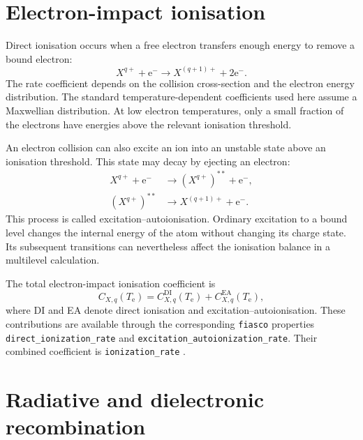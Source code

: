 \documentclass[a4paper,10pt,twoside,openany]{book}
\begin{document}
\section{Electron-impact ionisation}
\label{subsec:electron_ionisation}

Direct ionisation occurs when a free electron transfers enough energy to
remove a bound electron:
\begin{equation}
 X^{q+}+\mathrm e^-
 \longrightarrow X^{(q+1)+}+2\mathrm e^-.
 \label{eq:ion_direct_reaction}
\end{equation}
The rate coefficient depends on the collision cross-section and the electron
energy distribution. The standard temperature-dependent coefficients used here
assume a Maxwellian distribution. At low electron temperatures, only a small
fraction of the electrons have energies above the relevant ionisation threshold.

An electron collision can also excite an ion into an unstable state above an
ionisation threshold. This state may decay by ejecting an electron:
\begin{align}
 X^{q+}+\mathrm e^-
 &\longrightarrow (X^{q+})^{**}+\mathrm e^-,
 \nonumber\\
 (X^{q+})^{**}
 &\longrightarrow X^{(q+1)+}+\mathrm e^-.
 \label{eq:ion_ea_reaction}
\end{align}
This process is called excitation--autoionisation. Ordinary excitation to a
bound level changes the internal energy of the atom without changing its
charge state. Its subsequent transitions can nevertheless affect the
ionisation balance in a multilevel calculation.

The total electron-impact ionisation coefficient is
\begin{equation}
 C_{X,q}(T_{\mathrm e})
 =C_{X,q}^{\mathrm{DI}}(T_{\mathrm e})
 +C_{X,q}^{\mathrm{EA}}(T_{\mathrm e}),
 \label{eq:ion_total_electron}
\end{equation}
where DI and EA denote direct ionisation and excitation--autoionisation.
These contributions are available through the corresponding
\texttt{fiasco} properties \texttt{direct\_ionization\_rate} and
\texttt{excitation\_autoionization\_rate}. Their combined coefficient is
\texttt{ionization\_rate} \cite{fiasco_rates}.

\section{Radiative and dielectronic recombination}
\label{subsec:electron_recombination}
\end{document}
